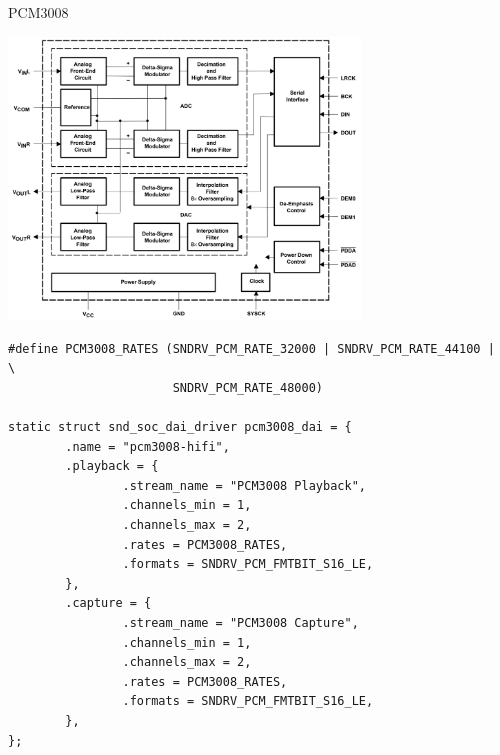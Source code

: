 \begin{frame}[fragile]{PCM3008}
  \begin{center}
  \includegraphics[width=0.7\textwidth]{slides/audio-asoc-codec/pcm3008.png}
  \end{center}
\end{frame}

\begin{frame}[fragile]{}
  \begin{block}{}
    \fontsize{9}{9}\selectfont
    \begin{verbatim}
#define PCM3008_RATES (SNDRV_PCM_RATE_32000 | SNDRV_PCM_RATE_44100 |        \
                       SNDRV_PCM_RATE_48000)

static struct snd_soc_dai_driver pcm3008_dai = {
        .name = "pcm3008-hifi",
        .playback = {
                .stream_name = "PCM3008 Playback",
                .channels_min = 1,
                .channels_max = 2,
                .rates = PCM3008_RATES,
                .formats = SNDRV_PCM_FMTBIT_S16_LE,
        },
        .capture = {
                .stream_name = "PCM3008 Capture",
                .channels_min = 1,
                .channels_max = 2,
                .rates = PCM3008_RATES,
                .formats = SNDRV_PCM_FMTBIT_S16_LE,
        },
};
    \end{verbatim}
  \end{block}
\end{frame}

